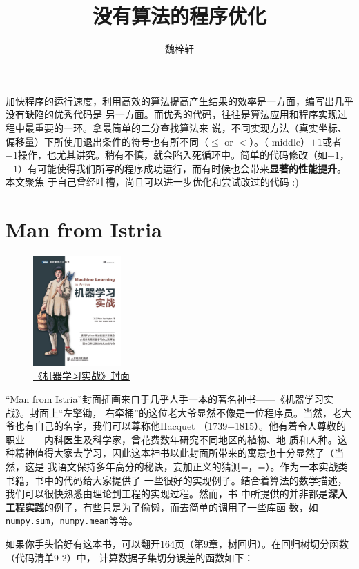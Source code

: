 \documentclass[12pt, a4paper]{article}
\begin{document}
\title{没有算法的程序优化}
\author{魏梓轩}
\maketitle

加快程序的运行速度，利用高效的算法提高产生结果的效率是一方面，编写出几乎没有缺陷的优秀代码是
另一方面。而优秀的代码，往往是算法应用和程序实现过程中最重要的一环。拿最简单的二分查找算法来
说，不同实现方法（真实坐标、偏移量）下所使用退出条件的符号也有所不同（$\leq$ or $<$）。（
middle）$+1$或者$-1$操作，也尤其讲究。稍有不慎，就会陷入死循环中。简单的代码修改（如$+1$，
$-1$）有可能使得我们所写的程序成功运行，而有时候也会带来\textbf{显著的性能提升}。本文聚焦
于自己曾经吐槽，尚且可以进一步优化和尝试改过的代码 :)

\section{Man from Istria}
\begin{figure}[h!]
    \centering
    \includegraphics[width=0.3\textwidth]{asset/1021.jpg}
    \caption{\href{http://www.ituring.com.cn/book/1021}{《机器学习实战》封面}}
\end{figure}

“Man from Istria”封面插画来自于几乎人手一本的著名神书——《机器学习实战》。封面上“左擎锄，
右牵桶”的这位老大爷显然不像是一位程序员。当然，老大爷也有自己的名字，我们可以尊称他Hacquet
（1739$-$1815）。他有着令人尊敬的职业——内科医生及科学家，曾花费数年研究不同地区的植物、地
质和人种。这种精神值得大家去学习，因此这本神书以此封面所带来的寓意也十分显然了（当然，这是
我语文保持多年高分的秘诀，妄加正义的猜测=，=）。作为一本实战类书籍，书中的代码给大家提供了
一些很好的实现例子。结合着算法的数学描述，我们可以很快熟悉由理论到工程的实现过程。然而，书
中所提供的并非都是\textbf{深入工程实践}的例子，有些只是为了偷懒，而去简单的调用了一些库函
数，如\texttt{numpy.sum}，\texttt{numpy.mean}等等。

如果你手头恰好有这本书，可以翻开164页（第9章，树回归）。在回归树切分函数（代码清单9-2）中，
计算数据子集切分误差的函数如下：
\end{document}
